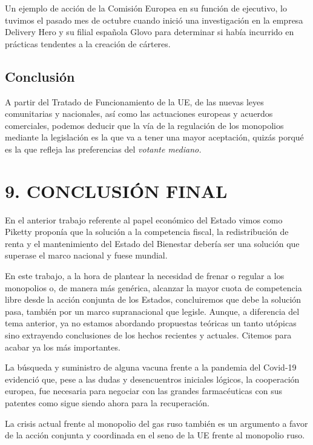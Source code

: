 \documentclass[
]{article}
\begin{document}
Un ejemplo de acción de la Comisión Europea en su función de ejecutivo,
lo tuvimos el pasado mes de octubre cuando inició una investigación en
la empresa Delivery Hero y su filial española Glovo para determinar si
había incurrido en prácticas tendentes a la creación de cárteres.

\hypertarget{conclusiuxf3n-4}{%
\subsection*{Conclusión}\label{conclusiuxf3n-4}}

A partir del Tratado de Funcionamiento de la UE, de las nuevas leyes
comunitarias y nacionales, así como las actuaciones europeas y acuerdos
comerciales, podemos deducir que la vía de la regulación de los
monopolios mediante la legislación es la que va a tener una mayor
aceptación, quizás porqué es la que refleja las preferencias del
\emph{votante mediano.}

\hypertarget{conclusiuxf3n-final}{%
\section*{9. CONCLUSIÓN FINAL}\label{conclusiuxf3n-final}}

En el anterior trabajo referente al papel económico del Estado vimos
como Piketty proponía que la solución a la competencia fiscal, la
redistribución de renta y el mantenimiento del Estado del Bienestar
debería ser una solución que superase el marco nacional y fuese mundial.

En este trabajo, a la hora de plantear la necesidad de frenar o regular
a los monopolios o, de manera más genérica, alcanzar la mayor cuota de
competencia libre desde la acción conjunta de los Estados, concluiremos
que debe la solución pasa, también por un marco supranacional que
legisle. Aunque, a diferencia del tema anterior, ya no estamos abordando
propuestas teóricas un tanto utópicas sino extrayendo conclusiones de
los hechos recientes y actuales. Citemos para acabar ya los más
importantes.

La búsqueda y suministro de alguna vacuna frente a la pandemia del
Covid-19 evidenció que, pese a las dudas y desencuentros iniciales
lógicos, la cooperación europea, fue necesaria para negociar con las
grandes farmacéuticas con sus patentes como sigue siendo ahora para la
recuperación.

La crisis actual frente al monopolio del gas ruso también es un
argumento a favor de la acción conjunta y coordinada en el seno de la UE
frente al monopolio ruso.
\end{document}
